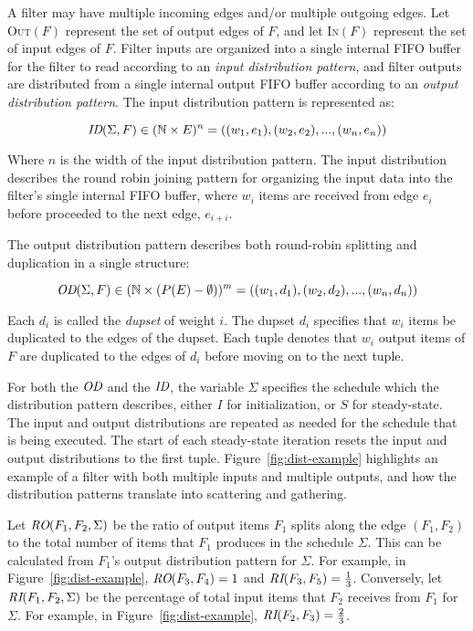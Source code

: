 A filter may have multiple incoming edges and/or multiple outgoing
edges.  Let \textsc{Out}$(F)$ represent the set of output edges of $F$, and 
let \textsc{In}$(F)$ represent the set of input edges of $F$.
Filter inputs are organized into a single internal FIFO buffer for the
filter to read according to an {\it input distribution pattern}, and
filter outputs are distributed from a single internal output FIFO
buffer according to an {\it output distribution pattern}.   
The input distribution pattern is represented as:

\[ \mbox{\it ID}(\Sigma, F) \in (\mathbb{N} \times E)^n = ((w_1,e_1), (w_2,
e_2), ..., (w_n, e_n))\]

\noindent Where $n$ is the width of the input distribution pattern.
The input distribution describes the round robin joining pattern for
organizing the input data into the filter's single internal FIFO
buffer, where $w_i$ items are received from edge $e_i$ before
proceeded to the next edge, $e_{i+i}$.

The output distribution pattern describes both round-robin
splitting and duplication in a single structure:

\[ \mbox{\it OD}(\Sigma, F) \in (\mathbb{N} \times (P(E)-\emptyset))^m = ((w_1,d_1), (w_2,
d_2), ..., (w_n, d_n))\]

\noindent Each $d_i$ is called the {\it dupset} of weight $i$.  The
dupset $d_i$ specifies that $w_i$ items be duplicated to the edges
of the dupset.  Each tuple denotes that $w_i$ output items of $F$ are
duplicated to the edges of $d_i$ before moving on to the next tuple.

For both the $\mbox{\it OD}$ and the $\mbox{\it ID}$, the variable
$\Sigma$ specifies the schedule which the distribution pattern
describes, either $I$ for initialization, or $S$ for steady-state.
The input and output distributions are repeated as needed for the
schedule that is being executed.  The start of each steady-state
iteration resets the input and output distributions to the first tuple.
Figure~\ref{fig:dist-example} highlights an example of a filter with
both multiple inputs and multiple outputs, and how the distribution
patterns translate into scattering and gathering.

Let $\mbox{\it RO}(F_1, F_2, \Sigma)$ be the ratio of output items $F_1$
splits along the edge $(F_1, F_2)$ to the total number of items that
$F_1$ produces in the schedule $\Sigma$.  This can be calculated from
$F_1$'s output distribution pattern for $\Sigma$.  For example, in
Figure~\ref{fig:dist-example}, $\mbox{\it RO}(F_3, F_4) = 1$ and
$\mbox{\it RI}(F_3, F_5) = \frac{1}{3}$.  Conversely, let $\mbox{\it RI}(F_1, F_2,
\Sigma)$ be the percentage of total input items that $F_2$ receives
from $F_1$ for $\Sigma$.  For example, in
Figure~\ref{fig:dist-example}, $\mbox{\it RI}(F_2,F_3) = \frac{2}{3}$.


